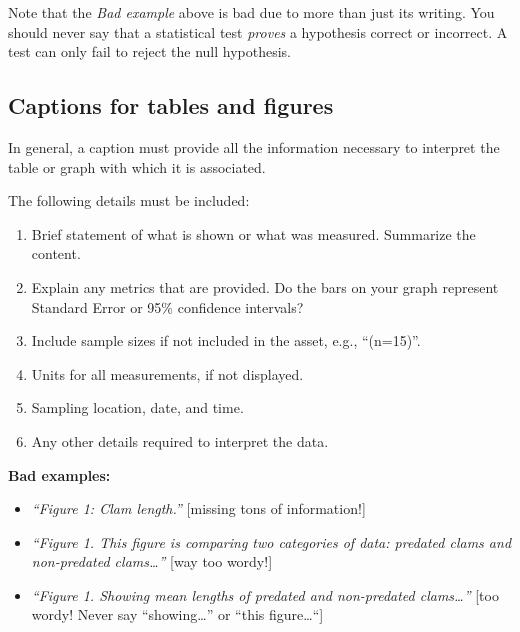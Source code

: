 \documentclass[]{book}
\providecommand{\tightlist}{%
  \setlength{\itemsep}{0pt}\setlength{\parskip}{0pt}}
\begin{document}
Note that the \emph{Bad example} above is bad due to more than just its writing. You should never say that a statistical test \emph{proves} a hypothesis correct or incorrect. A test can only fail to reject the null hypothesis.

\hypertarget{captions-for-tables-and-figures}{%
\subsection*{Captions for tables and figures}\label{captions-for-tables-and-figures}}

In general, a caption must provide all the information necessary to interpret the table or graph with which it is associated.

The following details must be included:

\begin{enumerate}
\def\labelenumi{\arabic{enumi}.}
\tightlist
\item
  Brief statement of what is shown or what was measured. Summarize the content.
\item
  Explain any metrics that are provided. Do the bars on your graph represent Standard Error or 95\% confidence intervals?
\item
  Include sample sizes if not included in the asset, e.g., ``(n=15)''.
\item
  Units for all measurements, if not displayed.\\
\item
  Sampling location, date, and time.\\
\item
  Any other details required to interpret the data.
\end{enumerate}

\textbf{Bad examples:}

\begin{itemize}
\tightlist
\item
  \emph{``Figure 1: Clam length.''} {[}missing tons of information!{]}\\
\item
  \emph{``Figure 1. This figure is comparing two categories of data: predated clams and non-predated clams\ldots{}''} {[}way too wordy!{]}
\item
  \emph{``Figure 1. Showing mean lengths of predated and non-predated clams\ldots{}''} {[}too wordy! Never say ``showing\ldots{}'' or ``this figure\ldots{}``{]}
\end{itemize}
\end{document}
